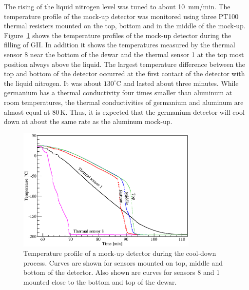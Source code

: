 The rising of the liquid nitrogen level was tuned to  about 10~mm/min. The temperature profile of the mock-up detector was monitored using three PT100 thermal resisters mounted on the top, bottom and in the middle of the mock-up. Figure~\ref{fig:ii:temp} shows the temperature profiles of the mock-up detector during the filling of GII. In addition it shows the temperatures measured by the thermal sensor 8 near the bottom of the dewar and the thermal sensor 1 at the top most position always above the liquid. The largest temperature difference between the top and bottom of the detector occurred at the first contact of the detector with the liquid nitrogen. It was about $130^{\circ}$C and lasted about three minutes. While germanium has a thermal conductivity four times smaller than aluminum at room temperatures, the thermal conductivities of germanium and aluminum are almost equal at 80\,K. Thus, it is expected that the germanium detector will cool down at about the same rate as the aluminum mock-up.

\begin{figure}[htbp]
\centering
\includegraphics[width=0.8\textwidth]{temp}
\caption{Temperature profile of a mock-up detector during the cool-down process. Curves are shown for sensors mounted on top, middle and bottom of the detector. Also shown are curves for sensors 8 and 1 mounted close to the bottom and top of the dewar.}
\label{fig:ii:temp}
\end{figure}

